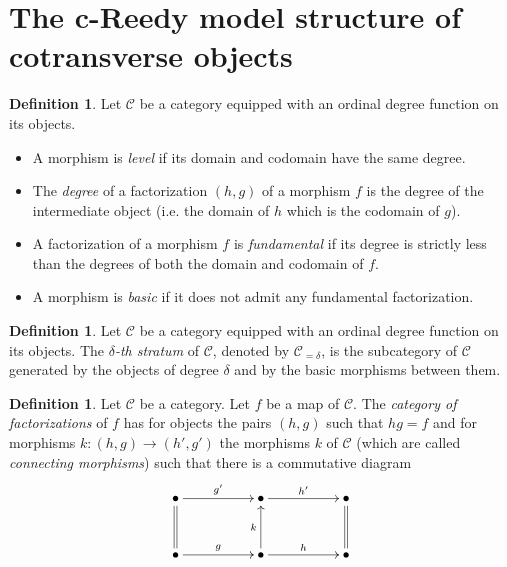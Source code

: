 \documentclass[a4paper,12pt]{amsart}
\makeatletter
\newcommand{\C}{\mathcal{C}}
\theoremstyle{definition}
\newtheorem{defn}[thm]{Definition}
\newcommand{\bd}{\begin{defn}}
\newcommand{\ed}{\end{defn}}
\newcommand{\fr}[1]{\ar@{->}[r]^-{#1}}
\newcommand{\fu}[1]{\ar@{->}[u]^-{#1}}
\makeatother
\begin{document}
\section{The c-Reedy model structure of cotransverse objects}
\label{c-Reedy}


\bd \cite[Definition~6.12]{c-Reedy} 
Let $\C$ be a category equipped with an ordinal degree function on its objects. 
\begin{itemize}
	\item A morphism is \textit{level} if its domain and codomain have the same degree.
	\item The \textit{degree} of a factorization $(h,g)$ of a morphism $f$ is the degree of the intermediate object (i.e. the domain of $h$ which is the codomain of $g$).
	\item A factorization of a morphism $f$ is \textit{fundamental} if its degree is strictly less than the degrees of both the domain and codomain of $f$.
	\item A morphism is \textit{basic} if it does not admit any fundamental factorization. 
\end{itemize}
\ed

\bd \cite[page~37]{c-Reedy}
	Let $\C$ be a category equipped with an ordinal degree function on its objects. The \textit{$\delta$-th stratum} of $\C$, denoted by $\C_{=\delta}$, is the subcategory of $\C$ generated by the objects of degree $\delta$ and by the basic morphisms between them.
\ed


\bd
Let $\C$ be a category. Let $f$ be a map of $\C$. The \textit{category of factorizations} of $f$ has for objects the pairs $(h,g)$ such that $hg=f$ and for morphisms $k:(h,g)\to (h',g')$ the morphisms $k$ of $\C$ (which are called \textit{connecting morphisms}) such that there is a commutative diagram 
\[
\xymatrix@C=5em@R=3em
{
	\bullet \fr{g'} \ar@{=}[d] & \bullet \fr{h'}& \bullet \ar@{=}[d] \\
	\bullet \fr{g} & \fu{k}\bullet \fr{h} & \bullet 
}
\]
\ed
\end{document}
